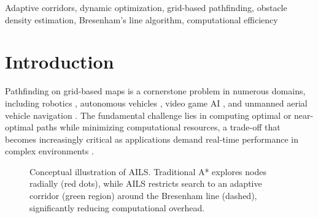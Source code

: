 \documentclass[journal]{IEEEtran}
\begin{document}
\begin{IEEEkeywords}
Adaptive corridors, dynamic optimization, grid-based pathfinding, obstacle density estimation, Bresenham's line algorithm, computational efficiency
\end{IEEEkeywords}

\section{Introduction}

Pathfinding on grid-based maps is a cornerstone problem in numerous domains, including robotics \cite{lavalle2006planning}, autonomous vehicles \cite{paden2016survey}, video game AI \cite{yap2002grid}, and unmanned aerial vehicle navigation \cite{gasparetto2015path}. The fundamental challenge lies in computing optimal or near-optimal paths while minimizing computational resources, a trade-off that becomes increasingly critical as applications demand real-time performance in complex environments \cite{liu2021path}.

\begin{figure}[t]
\centering
{}
\caption{Conceptual illustration of AILS. Traditional A* explores nodes radially (red dots), while AILS restricts search to an adaptive corridor (green region) around the Bresenham line (dashed), significantly reducing computational overhead.}
\label{fig:concept}
\end{figure}
\end{document}
